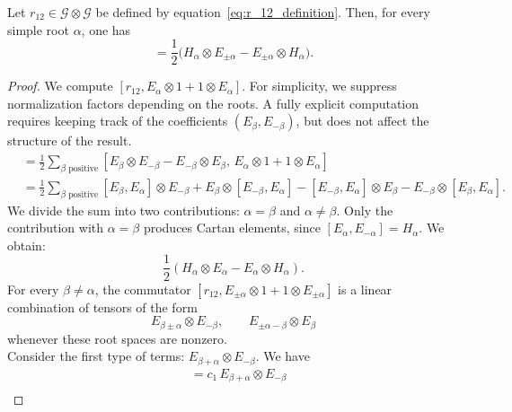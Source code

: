 \begin{lemma} \label{lemma:r_E}
    Let $r_{12} \in \mathcal{G} \otimes \mathcal{G}$ be defined by equation~\eqref{eq:r_12_definition}. 
    Then, for every simple root $\alpha$, one has
    \begin{equation}
        [r_{12},\, E_{\pm \alpha} \otimes 1 + 1 \otimes E_{\pm \alpha}]
        =
        \frac{1}{2}
        \bigl(
        H_{\alpha} \otimes E_{\pm \alpha}
        -
        E_{\pm \alpha} \otimes H_{\alpha}
        \bigr).
    \end{equation}
\end{lemma}
\begin{proof}
    We compute $ [r_{12}, E_\alpha\otimes1 + 1 \otimes E_{\alpha}]$.
    For simplicity, we suppress normalization factors depending on the roots. A fully explicit computation requires keeping track of the coefficients $(E_\beta, E_{-\beta})$, but does not affect the structure of the result.
    \begin{align}
        &= \frac12 \sum_{\beta \text{ positive}}
        [E_\beta\otimes E_{-\beta}-E_{-\beta}\otimes E_\beta,\,
        E_\alpha \otimes 1 + 1 \otimes E_\alpha ] \\
        &= \frac{1}{2} \sum_{\beta \text{ positive}}
        [E_\beta,E_\alpha]\otimes E_{-\beta}
        + E_\beta \otimes [E_{-\beta},E_\alpha]
        - [E_{-\beta},E_\alpha]\otimes E_\beta
        - E_{-\beta}\otimes [E_\beta,E_\alpha].
    \end{align}
    We divide the sum into two contributions: $\alpha = \beta$ and $\alpha \neq \beta$.
    Only the contribution with $\alpha=\beta$ produces Cartan elements, since $[E_\alpha,E_{-\alpha}] = H_\alpha$. We obtain:
    \begin{equation}
        \frac12
        \left(
        H_\alpha \otimes E_\alpha - E_\alpha \otimes H_\alpha
        \right).
    \end{equation}
    For every $\beta\neq\alpha$, the commutator $[r_{12}, E_{\pm\alpha} \otimes 1 + 1 \otimes E_{\pm\alpha}]$ is a linear combination of tensors of the form
    \begin{equation}
        E_{\beta\pm\alpha}\otimes E_{-\beta}, \qquad
        E_{\pm\alpha-\beta}\otimes E_{\beta}
    \end{equation}
    whenever these root spaces are nonzero. \\
    Consider the first type of terms: $E_{\beta + \alpha} \otimes E_{-\beta}$. We have
    \begin{align}
        [E_\beta \otimes E_{-\beta},\, E_\alpha \otimes 1] &= c_1 \, E_{\beta + \alpha} \otimes E_{-\beta} \\

\end{align}
\end{proof}
